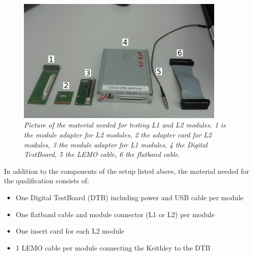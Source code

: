 \documentclass[a4paper,12pt,twoside]{article}
\begin{document}
\begin{figure} [h!] \centering 
\includegraphics[width=0.9\textwidth, angle=0] {./Figures/Material.jpg}
\caption{\em  \label{Material}
Picture of the material needed for testing L1 and L2 modules. 1 is the module adapter for L2 modules, 2 the adapter card for L2 modules, 3 the module adapter for L1 modules, 4 the Digital TestBoard, 5 the LEMO cable, 6 the flatband cable.}
\end{figure}

In addition to the components of the setup listed above, the material needed for the qualification consists of:

\begin{itemize}
\item One Digital TestBoard (DTB) including power and USB cable per module
\item One flatband cable and module connector (L1 or L2) per module
\item One insert card for each L2 module
\item 1 LEMO cable per module connecting the Keithley to the DTB
\end{itemize}
\end{document}
